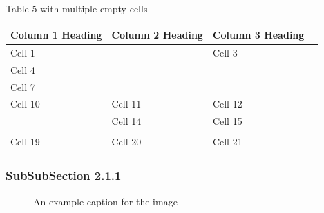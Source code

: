 \documentclass[11pt,a4paper]{article}
\begin{document}
Table 5 with multiple empty cells

\begin{table}[h]
\begin{tabular}{|l|l|l|l|}
\hline
Column 1 Heading & Column 2 Heading & Column 3 Heading &  \\ \hline
Cell 1 &  & Cell 3 &  \\ \hline
Cell 4 &  &  &  \\ \hline
Cell 7 &  &  &  \\ \hline
Cell 10 & Cell 11 & Cell 12 &  \\ \hline
 & Cell 14 & Cell 15 &  \\ \hline
 &  &  &  \\ \hline
Cell 19 & Cell 20 & Cell 21 &  \\ \hline
\end{tabular}
\end{table}

\subsubsection{SubSubSection 2.1.1}

\begin{figure}[h]
\end{figure}

\begin{figure}[h]
\caption{An example caption for the image}
\end{figure}
\end{document}
